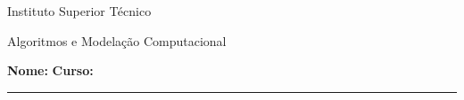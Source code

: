 \begin{center}
    \Large Instituto Superior Técnico
    
    Algoritmos e Modelação Computacional
\end{center}

\vspace{50pt}
{\Large\textbf{Nome:}}
\hrulefill
\quad
{\Large\textbf{Curso:}}
\rule{75pt}{0.25pt}